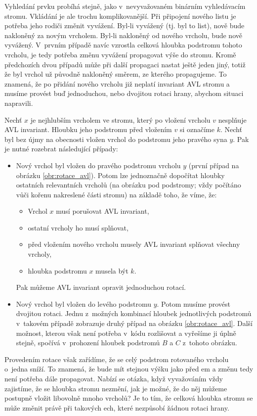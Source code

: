 Vyhledání prvku probíhá stejně, jako v~nevyvažovaném binárním vyhledávacím stromu. 
Vkládání je ale trochu komplikovanější. Při připojení nového listu je potřeba
jeho rodiči změnit vyvážení. Byl-li vyvážený (tj. byl to list), nově bude
nakloněný za novým vrcholem. Byl-li nakloněný od nového vrcholu, bude nově
vyvážený. V~prvním případě navíc vzrostla celková hloubka podstromu tohoto
vrcholu, je tedy potřeba změnu vyvážení propagovat výše do stromu. Kromě
předchozích dvou případů  může při další propagaci nastat ještě jeden jiný,
totiž že byl vrchol už původně nakloněný směrem, ze kterého propagujeme. To
znamená, že po přidání nového vrcholu již neplatí invariant AVL stromu a musíme
provést buď jednoduchou, nebo dvojitou rotaci hrany, abychom situaci napravili.

Nechť $x$ je nejhlubším vrcholem ve stromu, který po vložení vrcholu $v$ nesplňuje AVL invariant. Hloubku jeho podstromu před vložením $v$ si označíme $k$. Nechť byl bez újmy na obecnosti vložen vrchol do podstromu jeho pravého syna $y$. Pak je nutné rozebrat následující případy:
\begin{itemize}
\item Nový vrchol byl vložen do pravého podstromu vrcholu $y$ (první případ na
obrázku \ref{obr:rotace_avl}). Potom lze jednoznačně dopočítat hloubky
ostatních relevantních vrcholů (na obrázku pod podstromy; vždy počítáno vůči
kořenu nakreslené části stromu) na základě toho, že víme, že:
\begin{itemize}
\item Vrchol $x$ musí porušovat AVL
invariant, \item ostatní vrcholy ho musí splňovat, \item před vložením nového vrcholu
musely AVL invariant splňovat všechny vrcholy, \item hloubka podstromu $x$ musela
být $k$. 
\end{itemize}
Pak můžeme AVL invariant opravit jednoduchou rotací.  

\item Nový
vrchol byl vložen do levého podstromu $y$. Potom musíme provést
dvojitou rotaci. Jednu z~možných kombinací hloubek jednotlivých podstromů v~takovém případě zobrazuje
druhý případ na obrázku \ref{obr:rotace_avl}. Další možnost, kterou však není potřeba v~kódu
rozlišovat a vyřešíme ji úplně stejně, spočívá v~prohození hloubek podstromů
$B$ a $C$ z~tohoto obrázku.  
\end{itemize}

Provedením rotace však zařídíme, že se celý podstrom rotovaného vrcholu o~jedna
sníží. To znamená, že bude mít stejnou výšku jako před em a změnu tedy
není potřeba dále propagovat. Nabízí se otázka, když vyvažováním vždy
zajistíme, že se hloubka stromu nezmění, jak je možné, že do něj můžeme
postupně vložit libovolně mnoho vrcholů? Je to tím, že celková hloubka stromu
se může změnit právě při takových ech, které nezpůsobí žádnou
rotaci hrany.

